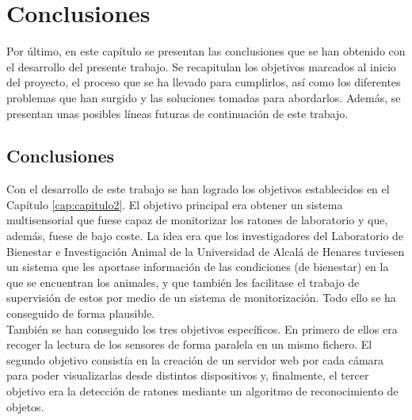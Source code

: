 \chapter{Conclusiones}
\label{cap:capitulo5}



\vspace{1cm}
Por último, en este capítulo se presentan las conclusiones que se han obtenido con el desarrollo del presente trabajo. Se recapitulan los objetivos marcados al inicio del proyecto, el proceso que se ha llevado para cumplirlos, así como los diferentes problemas que han surgido y las soluciones tomadas para abordarlos. Además, se presentan unas posibles líneas futuras de continuación de este trabajo.\\

\section{Conclusiones}
Con el desarrollo de este trabajo se han logrado los objetivos establecidos en el Capítulo \ref{cap:capitulo2}. El objetivo principal era obtener un sistema multisensorial que fuese capaz de monitorizar los ratones de laboratorio y que, además, fuese de bajo coste. La idea era que los investigadores del Laboratorio de Bienestar e Investigación Animal de la Universidad de Alcalá de Henares tuviesen un sistema que les aportase información de las condiciones (de bienestar) en la que se encuentran los animales, y que también les facilitase el trabajo de supervisión de estos por medio de un sistema de monitorización. Todo ello se ha conseguido de forma plausible.\\

También se han conseguido los tres objetivos específicos. En primero de ellos era recoger la lectura de los sensores de forma paralela en un mismo fichero. El segundo objetivo consistía en la creación de un servidor web por cada cámara para poder visualizarlas desde distintos dispositivos y, finalmente, el tercer objetivo era la detección de ratones mediante un algoritmo de reconocimiento de objetos.\\

